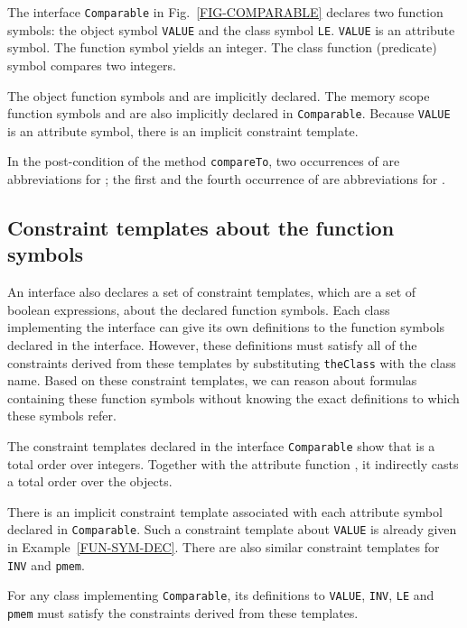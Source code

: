 \documentclass[fleqn]{llncs}
\begin{document}
\begin{example}\label{FUN-SYM-DEC}
The interface \texttt{Comparable} in Fig.~\ref{FIG-COMPARABLE} declares two function symbols: the object symbol
\texttt{VALUE} and the class symbol \texttt{LE}. \texttt{VALUE} is an attribute symbol. The function symbol  yields an integer. The class function
(predicate) symbol  compares two integers.

The object function symbols  and  are implicitly declared.
The memory scope function symbols  and  are also implicitly declared in \texttt{Comparable}.
Because \texttt{VALUE} is an attribute symbol, there is an implicit constraint template.

In the post-condition of the method \texttt{compareTo}, two occurrences of  are abbreviations for ; the first
and the fourth occurrence of  are abbreviations for .
\hfill 
\end{example}


\subsection{Constraint templates about the function symbols}
An interface also declares a set of constraint templates, which are a set of boolean expressions, about the declared function symbols.
Each class implementing the interface can give its own definitions to the function symbols declared in the interface. However, these definitions must satisfy
all of the constraints derived from these templates by substituting \texttt{theClass} with the class name. Based on these constraint templates, we can reason about formulas containing these function symbols
without knowing the exact definitions to which these symbols refer.

\begin{example}
The constraint templates declared in the interface \texttt{Comparable} show that  is a total order over integers.
Together with the attribute function , it indirectly casts a total order over the objects.

There is an implicit constraint template associated with each attribute symbol declared in \texttt{Comparable}. Such a constraint template about \texttt{VALUE} is already given
in Example~\ref{FUN-SYM-DEC}.
There are also similar constraint templates for \texttt{INV} and \texttt{pmem}.

For any class implementing \texttt{Comparable}, its definitions to \texttt{VALUE}, \texttt{INV}, \texttt{LE} and \texttt{pmem} must satisfy the constraints derived from these templates.
\hfill 
\end{example}
\end{document}
